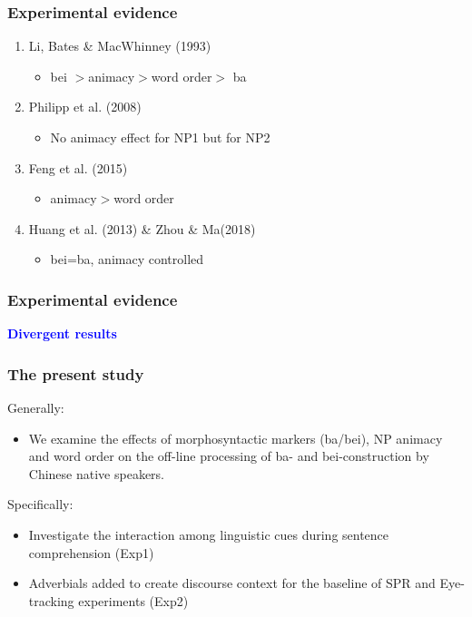 \documentclass{beamer}
\begin{document}
\begin{frame}
\frametitle{Experimental evidence}
\begin{enumerate}
   \item Li, Bates & MacWhinney (1993)
   \setlength{\parskip}{1em}
   \begin{itemize}
       \item bei $> $animacy$> $word order$>$ ba
   \end{itemize}
   \setlength{\parskip}{1em}
   \item Philipp et al. (2008)
    \begin{itemize}
    \item No animacy effect for NP1 but for NP2
   \end{itemize}
   \item Feng et al. (2015)
   \setlength{\parskip}{1em}
   \begin{itemize}
       \item animacy$ > $word order
   \end{itemize}
   \setlength{\parskip}{1em}
   \item Huang et al. (2013) & Zhou \& Ma(2018)
    \begin{itemize}
    \item bei=ba, animacy controlled
   \end{itemize}
\end{enumerate}
\frametitle{Experimental evidence}
\centering
\pause
\textbf{\textcolor{blue}{Divergent results}}
\pause
\end{frame}





\begin{frame}
\frametitle{The present study}
\begin{block}{Generally:}
\begin{itemize}
    \pause
    \item We examine the effects of morphosyntactic markers (ba/bei), NP animacy and word order on the off-line processing of ba- and bei-construction by Chinese native speakers.
    \pause
\end{itemize}
\end{block}

\begin{block}{Specifically:}
\begin{itemize}
    \pause
    \item Investigate the interaction among linguistic cues during sentence comprehension (Exp1)
    \pause
    \pause
    \item Adverbials added to create discourse context for the baseline of SPR and Eye-tracking experiments (Exp2)
    \pause
\end{itemize}
\end{block}

\end{frame}
\end{document}
